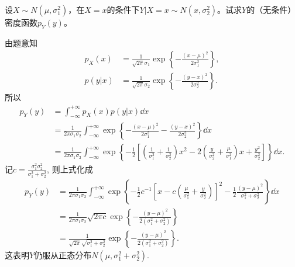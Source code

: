 \begin{example}\label{exam:3.5.6}
    设$X\sim N(\mu,\sigma_1^2)$，在$X=x$的条件下$Y|X=x\sim N(x,\sigma_2^2)$。试求$Y$的（无条件）密度函数$p_Y(y)$。
\end{example}
\begin{solution}
    由题意知
    \begin{align*}
        p_{X}(x) & =\frac{1}{\sqrt{2 \pi} \sigma_{1}} \exp \left\{-\frac{(x-\mu)^{2}}{2 \sigma_{1}^{2}}\right\}, \\
        p(y | x) & =\frac{1}{\sqrt{2 \pi} \sigma_{2}} \exp \left\{-\frac{(y-x)^{2}}{2 \sigma_{2}^{2}}\right\}.
    \end{align*}
    所以
    \begin{align*}
        p_{Y}(y) & =\int_{-\infty}^{+\infty} p_{X}(x) p(y | x) \dd x                                               \\
                 & =\frac{1}{2 \pi \sigma_{1} \sigma_{2}} \int_{-\infty}^{+\infty}\exp \left\{-\frac{(x-\mu)^{2} }
        {2 \sigma_{1}^{2}}-\frac{(y-x)^{2}}{2 \sigma_{2}^{2}}\right\} \dd x                                        \\
                 & =\frac{1}{2 \pi \sigma_{1} \sigma_{2}} \int_{-\infty}^{+\infty}
        \exp \left\{-\frac{1}{2}\left[\left(\frac{1}{\sigma_{1}^{2}}+\frac{1}{\sigma_{2}^{2}}\right) x^{2}-2\left(\frac{y}{\sigma_{2}^{2}}+\frac{\mu}{\sigma_{1}^{2}}\right) x+\frac{y^{2}}{\sigma_{2}^{2}}\right]\right\} \dd x .
    \end{align*}
    记$c=\frac{\sigma_{1}^{2} \sigma_{2}^{2}}{\sigma_{1}^{2}+\sigma_{2}^{2}}$, 则上式化成
    \begin{align*}
        p_{Y}(y) & =\frac{1}{2 \pi \sigma_{1} \sigma_{2}} \int_{-\infty}^{+\infty} \exp \left\{-\frac{1}{2} c^{-1}\left[x-c\left(\frac{\mu}{\sigma_{1}^{2}}+\frac{y}{\sigma_{2}^{2}}\right)\right]^{2}-\frac{1}{2} \frac{(y-\mu)^{2}}{\sigma_{1}^{2}+\sigma_{2}^{2}}\right\} \dd x \\
                 & =\frac{1}{2 \pi \sigma_{1} \sigma_{2}} \sqrt{2 \pi c} \exp \left\{-\frac{(y-\mu)^{2}}{2\left(\sigma_{1}^{2}+\sigma_{2}^{2}\right)}\right\}                                                                                                                      \\
                 & =\frac{1}{\sqrt{2 \pi} \sqrt{\sigma_{1}^{2}+\sigma_{2}^{2}}} \exp \left\{-\frac{(y-\mu)^{2}}{2\left(\sigma_{1}^{2}+\sigma_{2}^{2}\right)}\right\} .
    \end{align*}
    这表明$Y$仍服从正态分布$N(\mu,\sigma_1^2+\sigma_2^2)$.
\end{solution}

